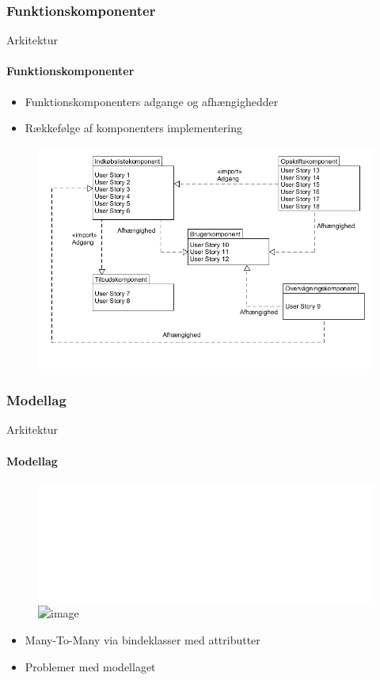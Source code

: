 		\subsubsection{Funktionskomponenter}
		\begin{frame}[t]{Arkitektur}\framesubtitle{Funktionskomponenter}
			\begin{itemize}
				\item Funktionskomponenters adgange og afhængighedder
				\item Rækkefølge af komponenters implementering
			\end{itemize}
			\vspace{-5pt}
			\begin{figure}[h!]
				\centering
				\includegraphics[width=1\textwidth]{images/Komponenter.png} %
			\end{figure}
		\end{frame}

		\subsubsection{Modellag}
			\begin{frame}[t]{Arkitektur}\framesubtitle{Modellag}
				\begin{figure}
					
					\includegraphics<1-2>[trim=8.2cm 16.5cm 0.5cm 6.3cm, clip, width=1\textwidth]{images/PF_Model_UML_Simple.pdf} %
					\includegraphics<3>[width=0.5\textwidth]{images/UML_Pref_med_felter.png} %

				\end{figure}
				\begin{itemize}
					\item<2> Many-To-Many via bindeklasser med attributter
					\item<3> Problemer med modellaget
				\end{itemize}
			\end{frame}
		
